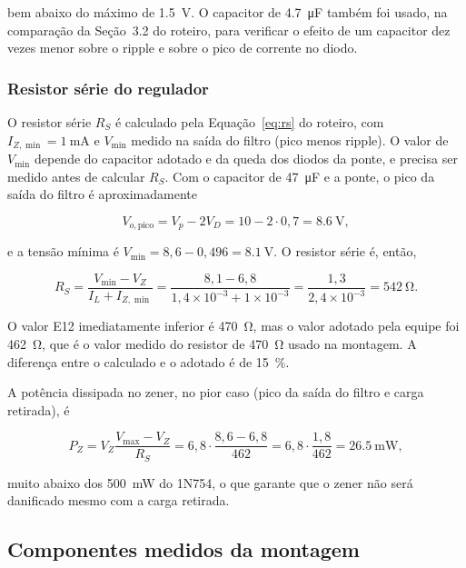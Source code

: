 \documentclass[11pt,a4paper]{article}
\begin{document}
bem abaixo do máximo de \SI{1,5}{\volt}. O capacitor de \SI{4,7}{\micro\farad} também foi usado, na comparação da Seção~3.2 do roteiro, para verificar o efeito de um capacitor dez vezes menor sobre o ripple e sobre o pico de corrente no diodo.
 
\subsubsection{Resistor série do regulador}
 
O resistor série $R_S$ é calculado pela Equação~\eqref{eq:rs} do roteiro, com $I_{Z,\min} = \SI{1}{\milli\ampere}$ e $V_{\min}$ medido na saída do filtro (pico menos ripple). O valor de $V_{\min}$ depende do capacitor adotado e da queda dos diodos da ponte, e precisa ser medido antes de calcular $R_S$. Com o capacitor de \SI{47}{\micro\farad} e a ponte, o pico da saída do filtro é aproximadamente
 
\begin{equation}
V_{o,\text{pico}} = V_p - 2 V_D = 10 - 2 \cdot 0{,}7 = \SI{8,6}{\volt} ,
\label{eq:pico_ponte_equipe}
\end{equation}
 
e a tensão mínima é $V_{\min} = 8{,}6 - 0{,}496 = \SI{8,1}{\volt}$. O resistor série é, então,
 
\begin{equation}
R_S = \frac{V_{\min} - V_Z}{I_L + I_{Z,\min}} = \frac{8{,}1 - 6{,}8}{1{,}4 \times 10^{-3} + 1 \times 10^{-3}} = \frac{1{,}3}{2{,}4 \times 10^{-3}} = \SI{542}{\ohm} .
\label{eq:rs_equipe}
\end{equation}
 
O valor E12 imediatamente inferior é \SI{470}{\ohm}, mas o valor adotado pela equipe foi \SI{462}{\ohm}, que é o valor medido do resistor de \SI{470}{\ohm} usado na montagem. A diferença entre o calculado e o adotado é de \SI{15}{\%}.
 
A potência dissipada no zener, no pior caso (pico da saída do filtro e carga retirada), é
 
\begin{equation}
P_Z = V_Z \frac{V_{\max} - V_Z}{R_S} = 6{,}8 \cdot \frac{8{,}6 - 6{,}8}{462} = 6{,}8 \cdot \frac{1{,}8}{462} = \SI{26,5}{\milli\watt} ,
\label{eq:pz_equipe}
\end{equation}
 
muito abaixo dos \SI{500}{\milli\watt} do 1N754, o que garante que o zener não será danificado mesmo com a carga retirada.
 
\subsection{Componentes medidos da montagem}
 
\end{document}
